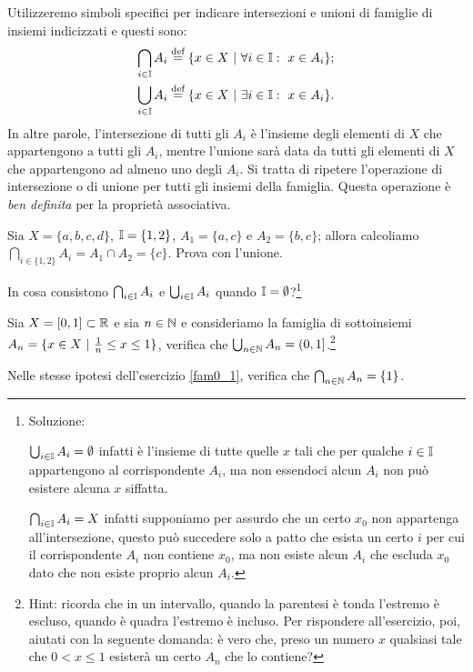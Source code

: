 		Utilizzeremo simboli specifici per indicare intersezioni e unioni di famiglie di insiemi indicizzati e questi sono: 
		\begin{align*} 
			\bigcap_{i\in\I} A_i \defeq \{x\in X\tc \forall i\in\I:\ x\in A_i\}; \\ \bigcup_{i\in\I} A_i \defeq \{x\in X\tc \exists i\in\I:\ x\in A_i\}. 
		\end{align*} 
		In altre parole, l'intersezione di tutti gli $A_i$ è l'insieme degli elementi di $X$ che appartengono a tutti gli $A_i$, mentre l'unione sarà data da tutti gli elementi di $X$ che appartengono ad almeno uno degli $A_i$. Si tratta di ripetere l'operazione di intersezione o di unione per tutti gli insiemi della famiglia. Questa operazione è \emph{ben definita} per la proprietà associativa.
		\begin{eg}
			Sia $X=\{a,b,c,d\}$, $\mathbb{I}=\{1,2\}$, $A_1=\{a,c\}$ e $A_2=\{b,c\}$; allora calcoliamo $\bigcap_{i\in\{1,2\}}A_i=A_1\cap A_2=\{c\}$. Prova con l'unione. 
		\end{eg} 
		\begin{es}
			In cosa consistono $\bigcap_{i\in\mathbb{I}}A_i$ e $\bigcup_{i\in\mathbb{I}}A_i$ quando $\mathbb{I}=\emptyset$?\footnote{Soluzione: \par $\bigcup_{i\in\mathbb{I}}A_i=\emptyset$ infatti è l'insieme di tutte quelle $x$ tali che per qualche $i\in\mathbb{I}$ appartengono al corrispondente $A_i$, ma non essendoci alcun $A_i$ non può esistere alcuna $x$ siffatta. \par $\bigcap_{i\in\mathbb{I}}A_i=X$ infatti supponiamo per assurdo che un certo $x_0$ non appartenga all'intersezione, questo può succedere solo a patto che esista un certo $i$ per cui il corrispondente $A_i$ non contiene $x_0$, ma non esiste alcun $A_i$ che escluda $x_0$ dato che non esiste proprio alcun $A_i$.}
		\end{es}
		\begin{es} \label{fam0_1}
			Sia $X=[0,1]\subset\mathbb{R}$ e sia $n\in\mathbb{N}$ e consideriamo la famiglia di sottoinsiemi $A_n=\{x\in X\ \rvert\  \frac{1}{n}\leq x\leq 1\}$, verifica che $\bigcup_{n\in\mathbb{N}}A_n=(0,1]$.\footnote{Hint: ricorda che in un intervallo, quando la parentesi è tonda l'estremo è escluso, quando è quadra l'estremo è incluso. Per rispondere all'esercizio, poi, aiutati con la seguente domanda: è vero che, preso un numero $x$ qualsiasi tale che $0<x\leq 1$ esisterà un certo $A_n$ che lo contiene?}
		\end{es}
		\begin{es}
			Nelle stesse ipotesi dell'esercizio \ref{fam0_1}, verifica che $\bigcap_{n\in\mathbb{N}}A_n=\{1\}$.
		\end{es}
